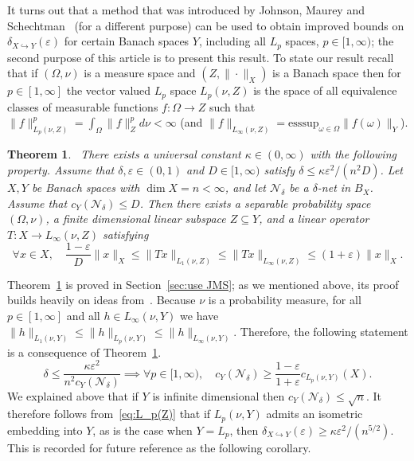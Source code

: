 \documentclass[12pt,reqno]{amsart}
\theoremstyle{plain}
\newtheorem{theorem}{Theorem}[section]
\theoremstyle{definition}
\newcommand{\e}{\varepsilon}
\renewcommand{\d}{\delta}
\renewcommand{\le}{\leqslant}
\renewcommand{\ge}{\geqslant}
\begin{document}
It turns out that a method that was introduced by Johnson, Maurey and Schechtman~\cite{JMS09} (for a different purpose) can be used to obtain improved bounds on $\delta_{X\hookrightarrow Y}(\e)$ for certain Banach spaces $Y$, including all $L_p$ spaces, $p\in [1,\infty)$; the second purpose of this article is to present this result. To state our result recall that if $(\Omega,\nu)$ is a measure space and $(Z,\|\cdot\|_X)$ is a Banach space then for $p\in [1,\infty]$ the vector valued $L_p$ space $L_p(\nu,Z)$ is the space of all equivalence classes of measurable functions $f:\Omega\to Z$ such that $\|f\|_{L_p(\nu,Z)}^p=\int_\Omega\|f\|_Z^pd\nu<\infty$ (and $\|f\|_{L_\infty(\nu,Z)}=\mathrm{esssup}_{\omega\in \Omega}\|f(\omega)\|_Y$).

\begin{theorem}~\label{thm:with Gid}
There exists a universal constant $\kappa\in (0,\infty)$ with the following property. Assume that $\d,\e\in (0,1)$ and $D\in [1,\infty)$ satisfy $\d\le \kappa\e^2/(n^2D)$. Let $X,Y$ be Banach spaces with $\dim X=n<\infty$, and let $\mathcal N_\d$ be a $\d$-net in $B_X$. Assume that $c_Y(\mathcal N_\d)\le D$. Then there exists a separable probability space $(\Omega,\nu)$, a finite dimensional linear subspace $Z\subseteq Y$, and a linear operator $T:X\to L_\infty(\nu,Z)$ satisfying
$$
\forall x\in X,\quad \frac{1-\e}{D}\|x\|_X\le \|Tx\|_{L_1(\nu,Z)}\le  \|Tx\|_{L_\infty(\nu,Z)}\le (1+\e)\|x\|_X.
$$
\end{theorem}
Theorem~\ref{thm:with Gid} is proved in Section~\ref{sec:use JMS}; as we mentioned above, its proof builds heavily on ideas from~\cite{JMS09}. Because $\nu$ is a probability measure, for all $p\in [1,\infty]$ and all $h\in L_\infty(\nu,Y)$ we have $\|h\|_{L_1(\nu,Y)}\le \|h\|_{L_p(\nu,Y)}\le \|h\|_{L_\infty(\nu,Y)}$. Therefore, the following statement is a consequence of Theorem~\ref{thm:with Gid}.
\begin{equation}\label{eq:L_p(Z)}
\d\le \frac{\kappa\e^2}{n^2c_Y(\mathcal N_\d)}\implies \forall p\in [1,\infty),\quad c_Y(\mathcal N_\d)\ge \frac{1-\e}{1+\e}c_{L_p(\nu,Y)}(X).
\end{equation}
We explained above that if $Y$ is infinite dimensional then  $c_Y(\mathcal N_\d)\le \sqrt{n}$. It therefore follows from~\eqref{eq:L_p(Z)} that if $L_p(\nu,Y)$ admits an isometric embedding into $Y$, as is the case when $Y=L_p$, then $\d_{X\hookrightarrow Y}(\e)\ge \kappa\e^2/(n^{5/2})$. This is recorded for future reference as the following corollary.
\end{document}
